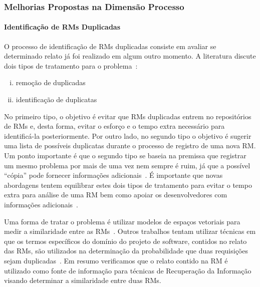 \subsubsection{Melhorias Propostas na Dimensão Processo}
\label{ssub:melhorias_dim_processo}

\paragraph{Identificação de RMs Duplicadas}

O processo de identificação de RMs duplicadas consiste em avaliar se determinado
relato já foi realizado em algum outro momento.  A literatura discute dois tipos
de tratamento para o problema~\cite{kaushik2012comparative, tian2012improved}:

\begin{enumerate}[(i)]
	\item remoção de duplicadas
	\item identificação de duplicatas
\end{enumerate}

No primeiro tipo, o objetivo é evitar que RMs duplicadas entrem no repositórios
de RMs e, desta forma, evitar o esforço e o tempo extra necessário para
identificá-la posteriormente. Por outro lado, no segundo tipo o objetivo é
sugerir uma lista de possíveis duplicatas durante o processo de registro de uma
nova RM\@. Um ponto importante é que o segundo tipo se baseia na premissa que
registrar um mesmo problema por mais de uma vez nem sempre é ruim, já que a
possível ``cópia'' pode fornecer informações
adicionais~\cite{bettenburg2008duplicate}. É importante que novas abordagens
tentem equilibrar estes dois tipos de tratamento para evitar o tempo extra para
análise de uma RM bem como apoiar os desenvolvedores com informações
adicionais~\cite{Lerch:2013:FDY:2495256.2495763,Thung2014}.

Uma forma de tratar o problema é utilizar modelos de espaços vetoriais para
medir a similaridade entre as RMs~\cite{liu2014faceted, sun2010discriminative,
    Thung2014,tomavsev2013exploiting}. Outros trabalhos tentam utilizar técnicas
em que os termos específicos do domínio do projeto de software, contidos no
relato das RMs, são utilizados na determinação da probabilidade que duas
requisições sejam duplicadas~\cite{hindle2016contextual, alipour2013contextual}.
Em resumo verificamos que o relato contido na RM é utilizado como fonte de
informação para técnicas de Re\-cu\-pe\-ra\-ção da Informação visando determinar
a similaridade entre duas RMs.

